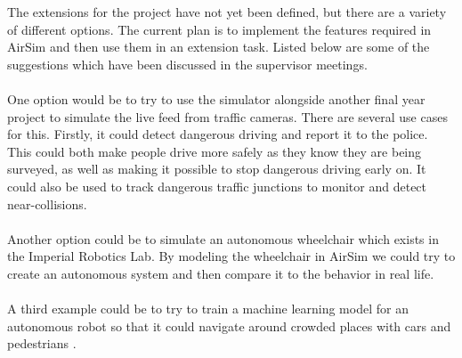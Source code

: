 The extensions for the project have not yet been defined, but there are a variety of different options. The current plan is to implement the features required in AirSim and then use them in an extension task. Listed below are some of the suggestions which have been discussed in the supervisor meetings. 
\\~\\
One option would be to try to use the simulator alongside another final year project to simulate the live feed from traffic cameras. There are several use cases for this. Firstly, it could detect dangerous driving and report it to the police. This could both make people drive more safely as they know they are being surveyed, as well as making it possible to stop dangerous driving early on. It could also be used to track dangerous traffic junctions to monitor and detect near-collisions. 
\\~\\
Another option could be to simulate an autonomous wheelchair which exists in the Imperial Robotics Lab. By modeling the wheelchair in AirSim we could try to create an autonomous system and then compare it to the behavior in real life.
\\~\\
A third example could be to try to train a machine learning model for an autonomous robot so that it could navigate around crowded places with cars and pedestrians \cite{ChaoQianwen2015Vifm}. 
\\~\\